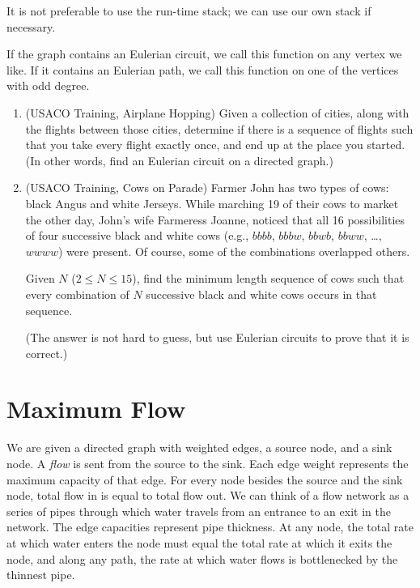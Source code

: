 It is not preferable to use the run-time stack; we can use our own stack if necessary.

If the graph contains an Eulerian circuit, we call this function on any vertex we like. If it contains an Eulerian path, we call this function on one of the vertices with odd degree.

\begin{enumerate}

\item
(USACO Training, Airplane Hopping)
Given a collection of cities, along with the flights between those cities, determine if there is a sequence of flights such that you take every flight exactly once, and end up at the place you started. (In other words, find an Eulerian circuit on a directed graph.)

\item
(USACO Training, Cows on Parade)
Farmer John has two types of cows: black Angus and white Jerseys. While marching 19 of their cows to market the other day, John's wife Farmeress Joanne, noticed that all 16 possibilities of four successive black and white cows (e.g., $bbbb$, $bbbw$, $bbwb$, $bbww$, \ldots, $wwww$) were present. Of course, some of the combinations overlapped others.

Given $N$ ($2 \le N \le 15$), find the minimum length sequence of cows such that every combination of $N$ successive black and white cows occurs in that sequence.

(The answer is not hard to guess, but use Eulerian circuits to prove that it is correct.)

\end{enumerate}

\section{Maximum Flow}

We are given a directed graph with weighted edges, a source node, and a sink node. A \textit{flow} is sent from the source to the sink. Each edge weight represents the maximum capacity of that edge. For every node besides the source and the sink node, total flow in is equal to total flow out. We can think of a flow network as a series of pipes through which water travels from an entrance to an exit in the network. The edge capacities represent pipe thickness. At any node, the total rate at which water enters the node must equal the total rate at which it exits the node, and along any path, the rate at which water flows is bottlenecked by the thinnest pipe.

